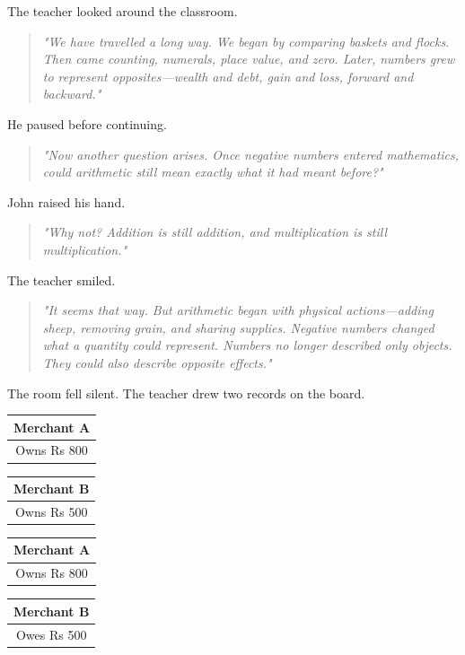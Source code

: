 \documentclass[11pt]{article}
\begin{document}
The teacher looked around the classroom.
\begin{quote}
\emph{"We have travelled a long way. We began by comparing baskets and flocks. Then came counting, numerals, place value, and zero. Later, numbers grew to represent opposites---wealth and debt, gain and loss, forward and backward."}
\end{quote}
He paused before continuing.
\begin{quote}
\emph{"Now another question arises. Once negative numbers entered mathematics, could arithmetic still mean exactly what it had meant before?"}
\end{quote}
John raised his hand.
\begin{quote}
\emph{"Why not? Addition is still addition, and multiplication is still multiplication."}
\end{quote}
The teacher smiled.
\begin{quote}
\emph{"It seems that way. But arithmetic began with physical actions---adding sheep, removing grain, and sharing supplies. Negative numbers changed what a quantity could represent. Numbers no longer described only objects. They could also describe opposite effects."}
\end{quote}
The room fell silent. The teacher drew two records on the board.
\begin{center}
\begin{tabular}{|c|}
\hline
Merchant A\\
\hline
Owns Rs 800\\
\hline
\end{tabular}
\hspace{0.5cm}
\begin{tabular}{|c|}
\hline
Merchant B\\
\hline
Owns Rs 500\\
\hline
\end{tabular}
\end{center}

\vspace{0.4cm}

\begin{center}
\begin{tabular}{|c|}
\hline
Merchant A\\
\hline
Owns Rs 800\\
\hline
\end{tabular}
\hspace{0.5cm}
\begin{tabular}{|c|}
\hline
Merchant B\\
\hline
Owes Rs 500\\
\hline
\end{tabular}
\end{center}
\end{document}
